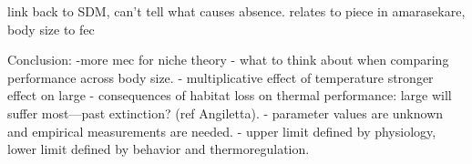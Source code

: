 link back to SDM, can't tell what causes absence.
relates to piece in amarasekare, body size to fec
       
Conclusion:
-more mec for niche theory
- what to think about when comparing performance across body size.
- multiplicative effect of temperature stronger effect on large
- consequences of habitat loss on thermal performance: large will suffer most---past extinction? (ref Angiletta).
- parameter values are unknown and empirical measurements are needed.
- upper limit defined by physiology, lower limit defined by behavior and thermoregulation.
